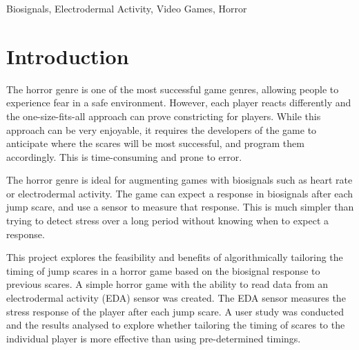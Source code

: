\documentclass[12pt,a4paper]{article}\usepackage[]{graphicx}\usepackage[]{color}
\begin{document}
\begin{keywords}
Biosignals, Electrodermal Activity, Video Games, Horror
\end{keywords}

\section{Introduction}
\label{sec:Intro}



The horror genre is one of the most successful game genres, allowing people to experience fear in a safe environment.
However, each player reacts differently and the one-size-fits-all approach can prove constricting for players.
While this approach can be very enjoyable, it requires the developers of the game to anticipate where the scares will be most successful, and program them accordingly.
This is time-consuming and prone to error.

The horror genre is ideal for augmenting games with biosignals such as heart rate or electrodermal activity.
The game can expect a response in biosignals after each jump scare, and use a sensor to measure that response.
This is much simpler than trying to detect stress over a long period without knowing when to expect a response.

This project explores the feasibility and benefits of algorithmically tailoring the timing of jump scares in a horror game based on the biosignal response to previous scares.
A simple horror game with the ability to read data from an electrodermal activity (EDA) sensor was created.
The EDA sensor measures the stress response of the player after each jump scare.
A user study was conducted and the results analysed to explore whether tailoring the timing of scares to the individual player is more effective than using pre-determined timings.
\end{document}
